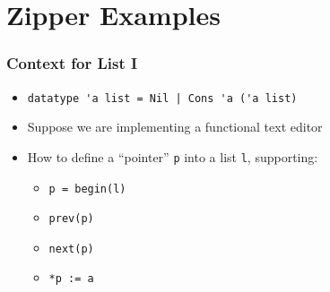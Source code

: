 \section{Zipper Examples}

\begin{frame}[fragile]
\frametitle{Context for List I}

\begin{itemize}[<+->]
\item \lstinline.datatype 'a list = Nil | Cons 'a ('a list).
\item Suppose we are implementing a functional text editor
\item How to define a ``pointer'' \lstinline|p| into a list \lstinline|l|, supporting:
\begin{itemize}
	\item \lstinline|p = begin(l)|
	\item \lstinline|prev(p)|
	\item \lstinline|next(p)|
	\item \lstinline|*p := a|
\end{itemize}
\end{itemize}

\end{frame}


